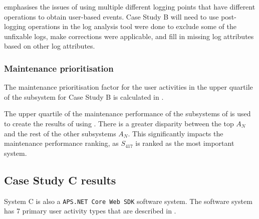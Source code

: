  emphasises the issues of using multiple different logging points that have different operations to obtain user-based events. Case Study B will need to use post-logging operations in the log analysis tool were done to exclude some of the unfixable logs, make corrections were applicable, and fill in missing log attributes based on other log attributes.

\subsubsection{Maintenance prioritisation}
The maintenance prioritisation factor for the user activities in the upper quartile of the subsystem for Case Study B is calculated in .



The upper quartile of the maintenance performance of the subsystems of  is used to create the results of  using . There is a greater disparity between the top $A_N$ and the rest of the other subsystems $A_N$. This significantly impacts the maintenance performance ranking, as $S_{417}$ is ranked as the most important system.

\subsection{Case Study C results}\label{sec:ch3_csC}
System C is also a \texttt{APS.NET Core Web SDK} software system. The software system has 7 primary user activity types that are described in .

